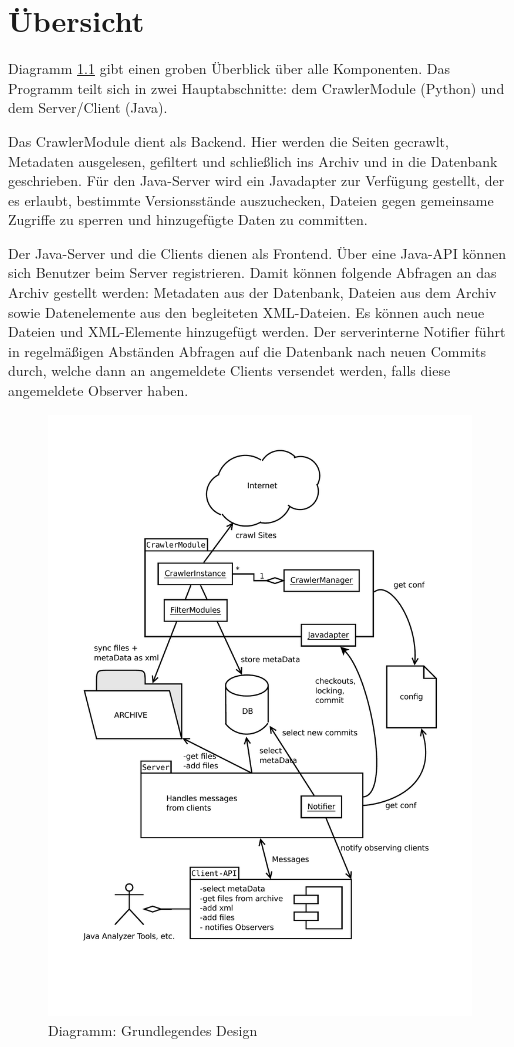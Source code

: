 \chapter{Übersicht}
Diagramm \ref{design:dia:modules} gibt einen groben Überblick über alle Komponenten.
Das Programm teilt sich in zwei Hauptabschnitte: dem CrawlerModule (Python) und dem Server/Client (Java).


Das CrawlerModule dient als Backend. Hier werden die Seiten gecrawlt, Metadaten ausgelesen, gefiltert und 
schließlich ins Archiv und in die Datenbank geschrieben. Für den Java-Server wird ein Javadapter zur 
Verfügung gestellt, der es erlaubt, bestimmte Versionsstände auszuchecken, Dateien gegen gemeinsame
Zugriffe zu sperren und hinzugefügte Daten zu committen.


Der Java-Server und die Clients dienen als Frontend. Über eine Java-API können sich
Benutzer beim Server registrieren. Damit können folgende Abfragen an das Archiv gestellt werden:
Metadaten aus der Datenbank, Dateien aus dem Archiv sowie Datenelemente aus den begleiteten XML-Dateien.
Es können auch neue Dateien und XML-Elemente hinzugefügt werden.
Der serverinterne Notifier führt in regelmäßigen Abständen Abfragen auf die Datenbank nach neuen
Commits durch, welche dann an angemeldete Clients versendet werden, falls diese angemeldete Observer haben.

\begin{figure}
	\centering
	\label{design:dia:modules}
	\includegraphics[height=\textheight]{design/components.pdf}
	\caption{Diagramm: Grundlegendes Design}
\end{figure}
